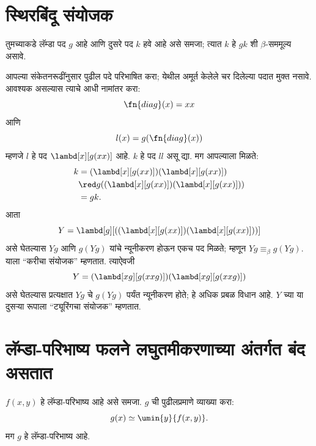 \section{स्थिरबिंदू संयोजक}\label{lam:int:fix:sec}

तुमच्याकडे लॅम्डा पद $g$ आहे आणि दुसरे पद $k$ हवे
आहे असे समजा; त्यात $k$ हे $gk$ शी
$\beta$-सममूल्य असावे.

आपल्या संकेतनरूढींनुसार पुढील पदे परिभाषित करा;
येथील अमूर्त केलेले चर दिलेल्या पदात मुक्त नसावे.
आवश्यक असल्यास त्याचे आधी नामांतर करा:
\[\fn{diag}(x) = xx
\]
आणि
\[l(x) = g(\fn{diag}(x))
\]
म्हणजे $l$ हे पद $\lambd[x][g(xx)]$ आहे.
$k$ हे पद $ll$ असू द्या. मग आपल्याला मिळते:
\begin{align*}
k & = (\lambd[x][g(xx)])(\lambd[x][g(xx)]) \\
& \red  g((\lambd[x][g(xx)])(\lambd[x][g(xx)])) \\
& = gk.
\end{align*}
आता
\[Y = \lambd[g][((\lambd[x][g(xx)])(\lambd[x][g(xx)]))]
\]
असे घेतल्यास $Yg$ आणि $g(Yg)$ यांचे न्यूनीकरण
होऊन एकच पद मिळते; म्हणून $Yg \equiv_\beta
g(Yg)$. याला “करीचा संयोजक” म्हणतात. त्याऐवजी
\[Y = (\lambd[xg][g(xxg)])(\lambd[xg][g(xxg)])
\]
असे घेतल्यास प्रत्यक्षात $Yg$ चे $g(Yg)$ पर्यंत
न्यूनीकरण होते; हे अधिक प्रबळ विधान आहे.
$Y$ च्या या दुसऱ्या रूपाला “ट्यूरिंगचा संयोजक”
म्हणतात.











\section{लॅम्डा-परिभाष्य फलने लघुतमीकरणाच्या अंतर्गत बंद असतात}\label{lam:int:min:sec}

\begin{lem}
$f(x,y)$ हे लॅम्डा-परिभाष्य आहे असे समजा.
$g$ ची पुढीलप्रमाणे व्याख्या करा:
\[g(x) \simeq \umin{y}{f(x,y)}.
\]
मग $g$ हे लॅम्डा-परिभाष्य आहे.
\end{lem}

